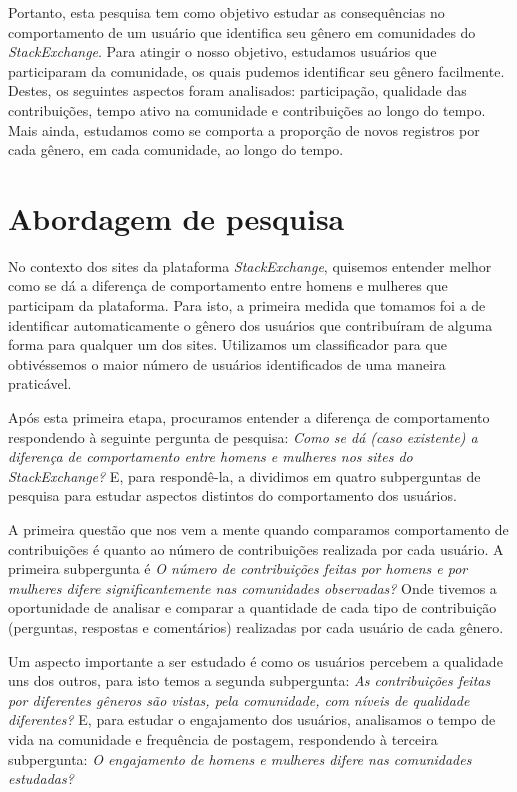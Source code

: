 Portanto, esta pesquisa tem como objetivo estudar as consequências no comportamento de um usuário que identifica seu gênero em comunidades do \emph{StackExchange}. Para atingir o nosso objetivo, estudamos usuários que participaram da comunidade, os quais pudemos identificar seu gênero facilmente. Destes, os seguintes aspectos foram analisados: participação, qualidade das contribuições, tempo ativo na comunidade e contribuições ao longo do tempo. Mais ainda, estudamos como se comporta a proporção de novos registros por cada gênero, em cada comunidade, ao longo do tempo.


\section{Abordagem de pesquisa}
No contexto dos sites da plataforma \emph{StackExchange}, quisemos entender melhor como se dá a diferença de comportamento entre homens e mulheres que participam da plataforma. Para isto, a primeira medida que tomamos foi a de identificar automaticamente o gênero dos usuários que contribuíram de alguma forma para qualquer um dos sites. Utilizamos um classificador para que obtivéssemos o maior número de usuários identificados de uma maneira praticável.

Após esta primeira etapa, procuramos entender a diferença de comportamento respondendo à seguinte pergunta de pesquisa: \emph{Como se dá (caso existente) a diferença de comportamento entre homens e mulheres nos sites do StackExchange?} E, para respondê-la, a dividimos em quatro subperguntas de pesquisa para estudar aspectos distintos do comportamento dos usuários.

A primeira questão que nos vem a mente quando comparamos comportamento de contribuições é quanto ao número de contribuições realizada por cada usuário. A primeira subpergunta é \textit{O número de contribuições feitas por homens e por mulheres difere significantemente nas comunidades observadas?} Onde tivemos a oportunidade de analisar e comparar a quantidade de cada tipo de contribuição (perguntas, respostas e comentários) realizadas por cada usuário de cada gênero.

Um aspecto importante a ser estudado é como os usuários percebem a qualidade uns dos outros, para isto temos a segunda subpergunta: \textit{As contribuições feitas por diferentes gêneros são vistas, pela comunidade, com níveis de qualidade diferentes?} E, para estudar o engajamento dos usuários, analisamos o tempo de vida na comunidade e frequência de postagem, respondendo à terceira subpergunta: \textit{O engajamento de homens e mulheres difere nas comunidades estudadas?}

